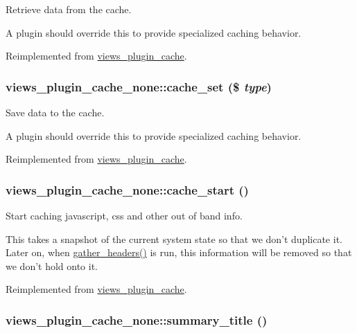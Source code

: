 Retrieve data from the cache.

A plugin should override this to provide specialized caching behavior. 

Reimplemented from \hyperlink{classviews__plugin__cache_77d1ef6d62d4eb84209cf310194b173b}{views\_\-plugin\_\-cache}.\hypertarget{classviews__plugin__cache__none_0c66f7c812356a9327ec968c7de6dc47}{
\subsubsection[{cache\_\-set}]{\setlength{\rightskip}{0pt plus 5cm}views\_\-plugin\_\-cache\_\-none::cache\_\-set (\$ {\em type})}}
\label{classviews__plugin__cache__none_0c66f7c812356a9327ec968c7de6dc47}


Save data to the cache.

A plugin should override this to provide specialized caching behavior. 

Reimplemented from \hyperlink{classviews__plugin__cache_4089f1652603b3e1012a8b0f00407c05}{views\_\-plugin\_\-cache}.\hypertarget{classviews__plugin__cache__none_17f65a53d00a8c51865027c3bce8172a}{
\subsubsection[{cache\_\-start}]{\setlength{\rightskip}{0pt plus 5cm}views\_\-plugin\_\-cache\_\-none::cache\_\-start ()}}
\label{classviews__plugin__cache__none_17f65a53d00a8c51865027c3bce8172a}


Start caching javascript, css and other out of band info.

This takes a snapshot of the current system state so that we don't duplicate it. Later on, when \hyperlink{classviews__plugin__cache_557cef7540eec7d0a6ad9cd030724ef7}{gather\_\-headers()} is run, this information will be removed so that we don't hold onto it. 

Reimplemented from \hyperlink{classviews__plugin__cache_a59c91a728401e1a49857346ae665ce7}{views\_\-plugin\_\-cache}.\hypertarget{classviews__plugin__cache__none_52838d0e7db62b5e92f837df6a4931b9}{
\subsubsection[{summary\_\-title}]{\setlength{\rightskip}{0pt plus 5cm}views\_\-plugin\_\-cache\_\-none::summary\_\-title ()}}
\label{classviews__plugin__cache__none_52838d0e7db62b5e92f837df6a4931b9}


